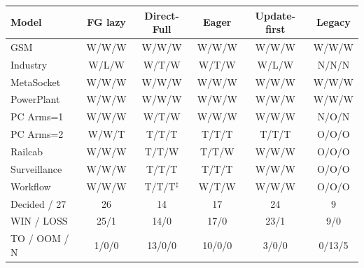 \begin{tabular}{@{}lccccc@{}}
\toprule
Model & FG lazy & Direct-Full & Eager & Update-first & Legacy\\
\midrule
GSM & W/W/W & W/W/W & W/W/W & W/W/W & W/W/W\\
Industry & W/L/W & W/T/W & W/T/W & W/L/W & N/N/N\\
MetaSocket & W/W/W & W/W/W & W/W/W & W/W/W & W/W/W\\
PowerPlant & W/W/W & W/W/W & W/W/W & W/W/W & W/W/W\\
PC Arms=1 & W/W/W & W/T/W & W/W/W & W/W/W & N/O/N\\
PC Arms=2 & W/W/T & T/T/T & T/T/T & T/T/T & O/O/O\\
Railcab & W/W/W & T/T/W & T/T/W & W/W/W & O/O/O\\
Surveillance & W/W/W & T/T/T & T/T/T & W/W/W & O/O/O\\
Workflow & W/W/W & T/T/T$^{\ddagger}$ & W/T/W & W/W/W & O/O/O\\
\midrule
Decided / 27 & 26 & 14 & 17 & 24 & 9\\
WIN / LOSS & 25/1 & 14/0 & 17/0 & 23/1 & 9/0\\
TO / OOM / N & 1/0/0 & 13/0/0 & 10/0/0 & 3/0/0 & 0/13/5\\
\bottomrule
\end{tabular}
\par{}
